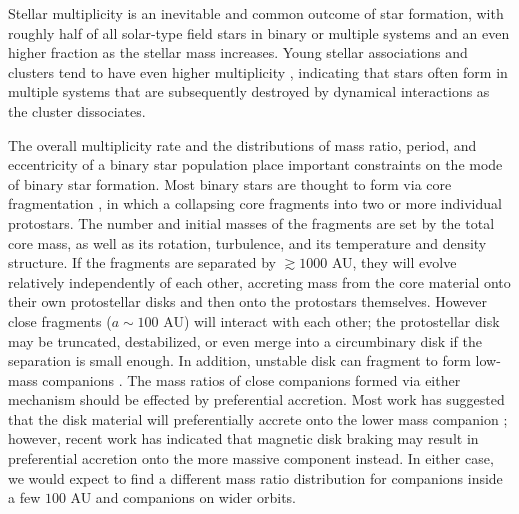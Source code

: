 \documentclass{emulateapj}
\begin{document}

Stellar multiplicity is an inevitable and common outcome of star formation, with roughly half of all solar-type field stars in binary or multiple systems \citep{Raghavan2010} and an even higher fraction as the stellar mass increases. Young stellar associations and clusters tend to have even higher multiplicity \citep{Duchene2013}, indicating that stars often form in multiple systems that are subsequently destroyed by dynamical interactions as the cluster dissociates. 

The overall multiplicity rate and the distributions of mass ratio, period, and eccentricity of a binary star population place important constraints on the mode of binary star formation. Most binary stars are thought to form via core fragmentation \citep{Boss1979, Boss1986, Bate1995}, in which a collapsing core fragments into two or more individual protostars. The number and initial masses of the fragments are set by the total core mass, as well as its rotation, turbulence, and its temperature and density structure. If the fragments are separated by $\gtrsim 1000$ AU, they will evolve relatively independently of each other, accreting mass from the core material onto their own protostellar disks and then onto the protostars themselves. However close fragments ($a \sim 100$ AU) will interact with each other; the protostellar disk may be truncated, destabilized, or even merge into a circumbinary disk if the separation is small enough. In addition, unstable disk can fragment to form low-mass companions \citep{Kratter2006, Stamatellos2011}. The mass ratios of close companions formed via either mechanism should be effected by preferential accretion. Most work has suggested that the disk material will preferentially accrete onto the lower mass companion \citep{Bate1997, BBB2002}; however, recent work has indicated that magnetic disk braking may result in preferential accretion onto the more massive component \citep{Zhao2013} instead. In either case, we would expect to find a different mass ratio distribution for companions inside a few $100$ AU and companions on wider orbits.
\end{document}
